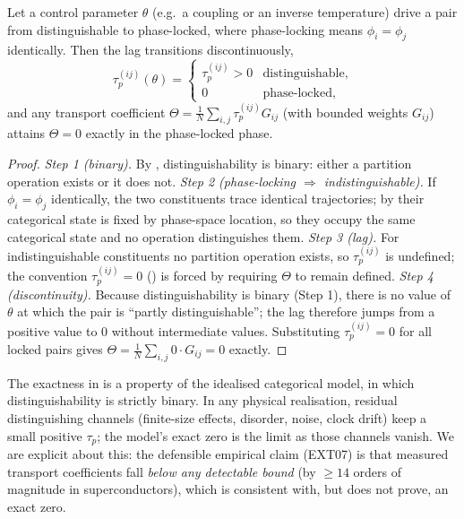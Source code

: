 \documentclass[11pt,twocolumn,a4paper]{article}
\newcommand{\tauP}{\tau_p}
\begin{document}
\begin{theorem}\label{thm:extinction}
Let a control parameter $\theta$ (e.g.\ a coupling or an inverse temperature)
drive a pair from distinguishable to phase-locked, where phase-locking means
$\phi_i=\phi_j$ identically. Then the lag transitions discontinuously,
\[
\tauP^{(ij)}(\theta)=\begin{cases}\tauP^{(ij)}>0 & \text{distinguishable},\\
0 & \text{phase-locked},\end{cases}
\]
and any transport coefficient $\Theta=\frac1N\sum_{i,j}\tauP^{(ij)}G_{ij}$
(with bounded weights $G_{ij}$) attains $\Theta=0$ exactly in the phase-locked
phase.
\end{theorem}

\begin{proof}
\emph{Step 1 (binary).} By , distinguishability is
binary: either a partition operation exists or it does not. \emph{Step 2
(phase-locking $\Rightarrow$ indistinguishable).} If $\phi_i=\phi_j$ identically,
the two constituents trace identical trajectories; by  their
categorical state is fixed by phase-space location, so they occupy the same
categorical state and no operation distinguishes them. \emph{Step 3 (lag).} For
indistinguishable constituents no partition operation exists, so $\tauP^{(ij)}$
is undefined; the convention $\tauP^{(ij)}=0$ () is forced
by requiring $\Theta$ to remain defined. \emph{Step 4 (discontinuity).} Because
distinguishability is binary (Step 1), there is no value of $\theta$ at which
the pair is ``partly distinguishable''; the lag therefore jumps from a positive
value to $0$ without intermediate values. Substituting $\tauP^{(ij)}=0$ for all
locked pairs gives $\Theta=\frac1N\sum_{i,j}0\cdot G_{ij}=0$ exactly.
\end{proof}

\begin{remark}
The exactness in  is a property of the idealised
categorical model, in which distinguishability is strictly binary. In any
physical realisation, residual distinguishing channels (finite-size effects,
disorder, noise, clock drift) keep a small positive $\tauP$; the model's exact
zero is the limit as those channels vanish. We are explicit about this: the
defensible empirical claim (EXT07) is that measured transport coefficients fall
\emph{below any detectable bound} (by $\ge 14$ orders of magnitude in
superconductors), which is consistent with, but does not prove, an exact zero.
\end{remark}
\end{document}
